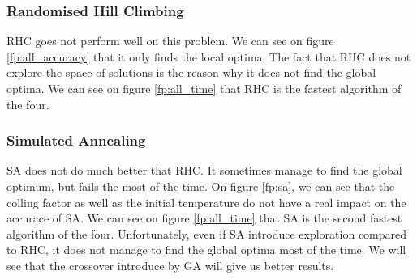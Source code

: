 \documentclass[10pt]{article}
\begin{document}
			\subsubsection*{Randomised Hill Climbing}
				RHC goes not perform well on this problem. We can see on figure \ref{fp:all_accuracy} that it only finds the local optima. The fact that RHC does not explore the space of solutions is the reason why it does not find the global optima. We can see on figure \ref{fp:all_time} that RHC is the fastest algorithm of the four.
			\subsubsection*{Simulated Annealing}
				SA does not do much better that RHC. It sometimes manage to find the global optimum, but fails the most of the time. On figure \ref{fp:sa}, we can see that the colling factor as well as the initial temperature do not have a real impact on the accurace of SA. We can see on figure \ref{fp:all_time} that SA is the second fastest algorithm of the four. Unfortunately, even if SA introduce exploration compared to RHC, it does not manage to find the global optima most of the time. We will see that the crossover introduce by GA will give us better results.
\end{document}
